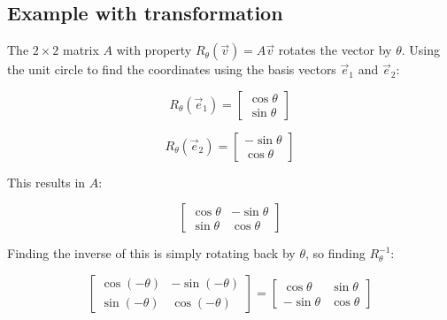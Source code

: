 \subsection{Example with transformation}

The $2\times 2$ matrix $A$ with property $R_\theta(\vec{v})=A\vec{v}$ rotates the vector by $\theta$.
Using the unit circle to find the coordinates using the basis vectors $\vec{e}_1$ and $\vec{e}_2$:

\[
    R_{\theta}\left(\vec{e}_{1}\right)=\left[\begin{array}{l}
    \cos \theta \\
    \sin \theta
    \end{array}\right]
\]

\[
    R_{\theta}\left(\vec{e}_{2}\right)=\left[\begin{array}{c}
    -\sin \theta \\
    \cos \theta
    \end{array}\right]
\]

This results in $A$:

\[
    \left[\begin{array}{cc}
    \cos \theta & -\sin \theta \\
    \sin \theta & \cos \theta
    \end{array}\right]
\]

Finding the inverse of this is simply rotating back by $\theta$, so finding $R^{-1}_{\theta}$:

\[
    \left[\begin{array}{cc}
    \cos (-\theta) & -\sin (-\theta) \\
    \sin (-\theta) & \cos (-\theta)
    \end{array}\right]
    =
    \left[\begin{array}{cc}
    \cos \theta & \sin \theta \\
    -\sin \theta & \cos \theta
    \end{array}\right]
\]